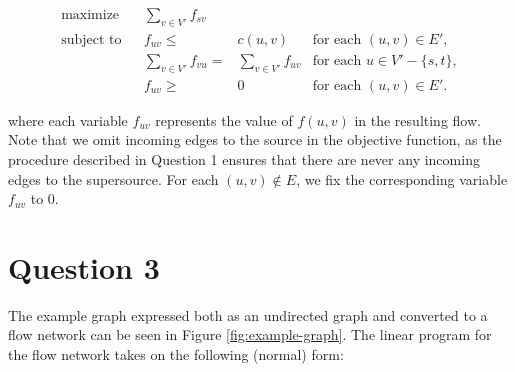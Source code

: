 \documentclass[a4paper, 10pt, oneside, article]{memoir}
\begin{document}
\begin{align*}
  \text{maximize} && \sum_{v\in V'} f_{sv} \\
  \text{subject to} && f_{uv} \leq{}& c(u,v) & \text{for each $(u,v) \in E'$}, \\
                    && \sum_{v \in V'} f_{vu} ={}& \sum_{v \in V'} f_{uv} & \text{for each $u \in V' - \{s, t \}$}, \\
                    && f_{uv} \geq{}& 0 & \text{for each $(u, v) \in E'$}.
\end{align*}

where each variable $f_{uv}$ represents the value of $f(u,v)$ in the
resulting flow. Note that we omit incoming edges to the source in the
objective function, as the procedure described in Question 1 ensures
that there are never any incoming edges to the supersource. For each
$(u,v) \not\in E$, we fix the corresponding variable $f_{uv}$ to 0.


\section*{Question 3}

The example graph expressed both as an undirected graph and converted
to a flow network can be seen in Figure \ref{fig:example-graph}. The
linear program for the flow network takes on the following (normal)
form:
\end{document}
